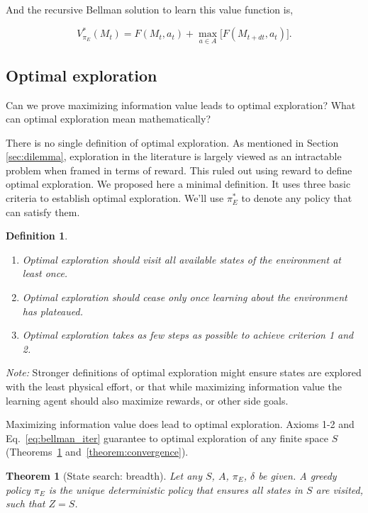 \documentclass[9pt,lineno]{elife}
\newtheorem{theorem}{Theorem}
\newtheorem{definition}{Definition}
\begin{document}
\noindent And the recursive Bellman solution to learn this value function is,

\begin{equation}\label{eq:bellman_iter} 
	V^*_{\pi_E}(M_{t}) = F(M_{t}, a_{t}) + \max_{a \in A} \Big [ F(M_{t+dt}, a_t) \Big ].
\end{equation}

\subsection{Optimal exploration}
Can we prove maximizing information value leads to optimal exploration? What can optimal exploration mean mathematically? 

There is no single definition of optimal exploration. As mentioned in Section \ref{sec:dilemma}, exploration in the literature is largely viewed as an intractable problem when framed in terms of reward. This ruled out using reward to define optimal exploration. We proposed here a minimal definition. It uses three basic criteria to establish optimal exploration. We'll use $\pi_E^*$ to denote any policy that can satisfy them.

\begin{definition}
\begin{enumerate}[noitemsep,wide=0pt,leftmargin=\dimexpr\labelwidth+2\labelsep\relax]
    \item Optimal exploration should visit all available states of the environment at least once. 
    \item Optimal exploration should cease only once learning about the environment has plateaued. 
    \item Optimal exploration takes as few steps as possible to achieve criterion 1 and 2.
\end{enumerate}
\end{definition}

\noindent
\textit{Note:} Stronger definitions of optimal exploration might ensure states are explored with the least physical effort, or that while maximizing information value the learning agent should also maximize rewards, or other side goals. 

Maximizing information value does lead to optimal exploration. Axioms 1-2 and Eq.~\ref{eq:bellman_iter} guarantee to optimal exploration of any finite space $S$ (Theorems~\ref{theorem:Z} and~\ref{theorem:convergence}).

\begin{theorem}[State search: breadth] \label{theorem:Z} 
    Let any $S$, $A$, $\pi_E$, $\delta$ be given. A greedy policy $\pi_E$ is the unique deterministic policy that ensures all states in $S$ are visited, such that $Z = S$. 
\end{theorem}
\end{document}
